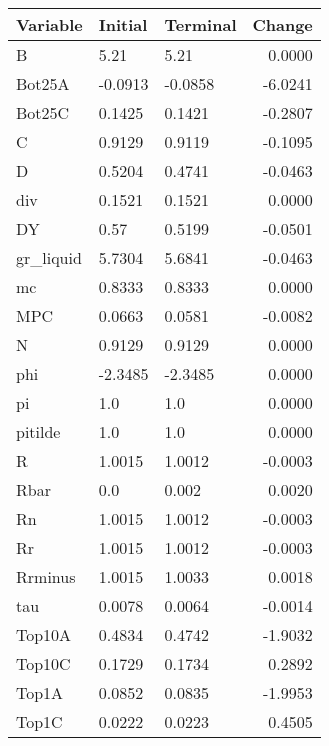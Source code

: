 \begin{table}
\centering
\label{tab:stst_comparison_slow_shock_wedge_permanent}
\begin{tabular}{lllr}
\toprule
                Variable & Initial & Terminal &  Change \\
\midrule
                       B &    5.21 &     5.21 &  0.0000 \\
                  Bot25A & -0.0913 &  -0.0858 & -6.0241 \\
                  Bot25C &  0.1425 &   0.1421 & -0.2807 \\
                       C &  0.9129 &   0.9119 & -0.1095 \\
                       D &  0.5204 &   0.4741 & -0.0463 \\
                     div &  0.1521 &   0.1521 &  0.0000 \\
                      DY &    0.57 &   0.5199 & -0.0501 \\
               gr\_liquid &  5.7304 &   5.6841 & -0.0463 \\
                      mc &  0.8333 &   0.8333 &  0.0000 \\
                     MPC &  0.0663 &   0.0581 & -0.0082 \\
                       N &  0.9129 &   0.9129 &  0.0000 \\
                     phi & -2.3485 &  -2.3485 &  0.0000 \\
                      pi &     1.0 &      1.0 &  0.0000 \\
                 pitilde &     1.0 &      1.0 &  0.0000 \\
                       R &  1.0015 &   1.0012 & -0.0003 \\
                    Rbar &     0.0 &    0.002 &  0.0020 \\
                      Rn &  1.0015 &   1.0012 & -0.0003 \\
                      Rr &  1.0015 &   1.0012 & -0.0003 \\
                 Rrminus &  1.0015 &   1.0033 &  0.0018 \\
                     tau &  0.0078 &   0.0064 & -0.0014 \\
                  Top10A &  0.4834 &   0.4742 & -1.9032 \\
                  Top10C &  0.1729 &   0.1734 &  0.2892 \\
                   Top1A &  0.0852 &   0.0835 & -1.9953 \\
                   Top1C &  0.0222 &   0.0223 &  0.4505 \\

\end{tabular}
\end{table}

